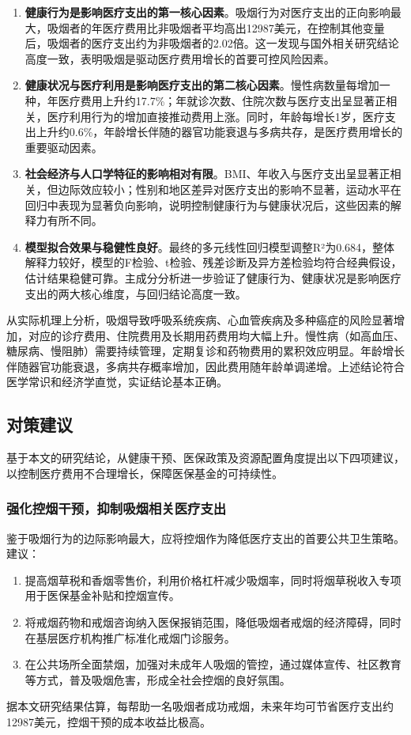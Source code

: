 \documentclass[a4paper]{ctexart}
\begin{document}
\begin{enumerate}[label=(\arabic*)]
\item \textbf{健康行为是影响医疗支出的第一核心因素}。吸烟行为对医疗支出的正向影响最大，吸烟者的年医疗费用比非吸烟者平均高出12987美元，在控制其他变量后，吸烟者的医疗支出约为非吸烟者的2.02倍。这一发现与国外相关研究结论高度一致，表明吸烟是驱动医疗费用增长的首要可控风险因素。

\item \textbf{健康状况与医疗利用是影响医疗支出的第二核心因素}。慢性病数量每增加一种，年医疗费用上升约17.7\%；年就诊次数、住院次数与医疗支出呈显著正相关，医疗利用行为的增加直接推动费用上涨。同时，年龄每增长1岁，医疗支出上升约0.6\%，年龄增长伴随的器官功能衰退与多病共存，是医疗费用增长的重要驱动因素。

\item \textbf{社会经济与人口学特征的影响相对有限}。BMI、年收入与医疗支出呈显著正相关，但边际效应较小；性别和地区差异对医疗支出的影响不显著，运动水平在回归中表现为显著负向影响，说明控制健康行为与健康状况后，这些因素的解释力有所不同。

\item \textbf{模型拟合效果与稳健性良好}。最终的多元线性回归模型调整R²为0.684，整体解释力较好，模型的F检验、t检验、残差诊断及异方差检验均符合经典假设，估计结果稳健可靠。主成分分析进一步验证了健康行为、健康状况是影响医疗支出的两大核心维度，与回归结论高度一致。
\end{enumerate}

从实际机理上分析，吸烟导致呼吸系统疾病、心血管疾病及多种癌症的风险显著增加，对应的诊疗费用、住院费用及长期用药费用均大幅上升。慢性病（如高血压、糖尿病、慢阻肺）需要持续管理，定期复诊和药物费用的累积效应明显。年龄增长伴随器官功能衰退，多病共存概率增加，因此费用随年龄单调递增。上述结论符合医学常识和经济学直觉，实证结论基本正确。

\subsection{对策建议}

基于本文的研究结论，从健康干预、医保政策及资源配置角度提出以下四项建议，以控制医疗费用不合理增长，保障医保基金的可持续性。

\subsubsection{强化控烟干预，抑制吸烟相关医疗支出}

鉴于吸烟行为的边际影响最大，应将控烟作为降低医疗支出的首要公共卫生策略。建议：
\begin{enumerate}[label=(\arabic*)]
\item 提高烟草税和香烟零售价，利用价格杠杆减少吸烟率，同时将烟草税收入专项用于医保基金补贴和控烟宣传。
\item 将戒烟药物和戒烟咨询纳入医保报销范围，降低吸烟者戒烟的经济障碍，同时在基层医疗机构推广标准化戒烟门诊服务。
\item 在公共场所全面禁烟，加强对未成年人吸烟的管控，通过媒体宣传、社区教育等方式，普及吸烟危害，形成全社会控烟的良好氛围。
\end{enumerate}
据本文研究结果估算，每帮助一名吸烟者成功戒烟，未来年均可节省医疗支出约12987美元，控烟干预的成本收益比极高。
\end{document}
